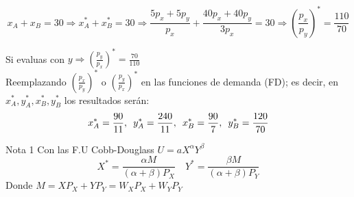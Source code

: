 \begin{itemize}
				$$x_A + x_B = 30 \Longrightarrow x_{A}^{*} + x_{B}^{*} = 30 \Longrightarrow \frac{5p_x+5p_y}{p_x} + \frac{40p_x+40p_y}{3p_x} = 30 \Longrightarrow \left( \frac{p_x}{p_y} \right)^{*}= \frac{110}{70}$$
				
			Si evaluas con $y \Longrightarrow \left( \frac{p_y}{p_x}\right)^{*} = \frac{70}{110}$\\
			
			Reemplazando $\left( \frac{p_x}{p_y} \right)^{*}$ o $\left( \frac{p_y}{p_x}\right)^{*}$ en las funciones de demanda (FD); es decir, en $x_{A}^{*}, y_{A}^{*}, x_{B}^{*}, y_{B}^{*}$ los resultados serán:
				$$x_{A}^{*} = \frac{90}{11}, \enskip y_{A}^{*} = \frac{240}{11}, \enskip x_{B}^{*} = \frac{90}{7}, \enskip y_{B}^{*} = \frac{120}{70}$$
			
				\begin{nota}{Nota 1}
					Con las F.U Cobb-Douglass $U=aX^{\alpha}Y^{\beta}$
						$$ X^* = \frac{\alpha M}{(\alpha + \beta)P_X} \quad Y^* = \frac{\beta M}{(\alpha + \beta) P_Y} $$
					Donde $M = XP_X+YP_Y = W_XP_X + W_YP_Y$
				\end{nota}
			

\end{itemize}
